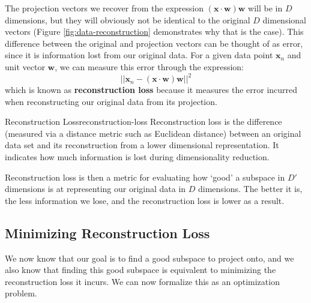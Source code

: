 The projection vectors we recover from the expression $(\textbf{x} \cdot \textbf{w})\textbf{w}$ will be in $D$ dimensions, but they will obviously not be identical to the original $D$ dimensional vectors (Figure \ref{fig:data-reconstruction} demonstrates why that is the case). This difference between the original and projection vectors can be thought of as error, since it is information lost from our original data. For a given data point $\textbf{x}_{n}$ and unit vector $\textbf{w}$, we can measure this error through the expression:
\begin{equation} \label{reconstruction-loss}
	||\textbf{x}_{n} - (\textbf{x} \cdot \textbf{w})\textbf{w}||^{2}
\end{equation}
which is known as \textbf{reconstruction loss} because it measures the error incurred when reconstructing our original data from its projection.

\begin{definition}{Reconstruction Loss}{reconstruction-loss}
    Reconstruction loss is the difference (measured via a distance metric such as Euclidean distance) between an original data set and its reconstruction from a lower dimensional representation. It indicates how much information is lost during dimensionality reduction.
\end{definition}

Reconstruction loss is then a metric for evaluating how `good' a subspace in $D'$ dimensions is at representing our original data in $D$ dimensions. The better it is, the less information we lose, and the reconstruction loss is lower as a result.

\subsection{Minimizing Reconstruction Loss}
We now know that our goal is to find a good subspace to project onto, and we also know that finding this good subspace is equivalent to minimizing the reconstruction loss it incurs. We can now formalize this as an optimization problem.


